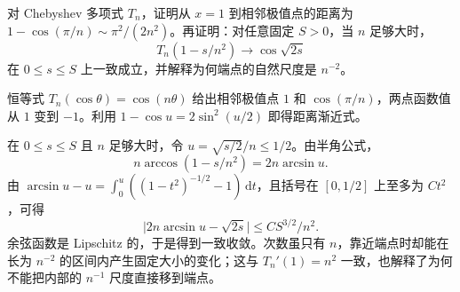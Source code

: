 \begin{optionalexercise}[端点附近的振荡尺度]\label{b2:ex:approximation-endpoint-scale}
对 Chebyshev 多项式 \(T_n\)，证明从 \(x=1\) 到相邻极值点的距离为 \(1-\cos(\pi/n)\sim\pi^2/(2n^2)\)。再证明：对任意固定 \(S>0\)，当 \(n\) 足够大时，
\[
 T_n(1-s/n^2)\longrightarrow\cos\sqrt{2s}
\]
在 \(0\leq s\leq S\) 上一致成立，并解释为何端点的自然尺度是 \(n^{-2}\)。
\end{optionalexercise}
\begin{solution}
恒等式 \(T_n(\cos\theta)=\cos(n\theta)\) 给出相邻极值点 \(1\) 和 \(\cos(\pi/n)\)，两点函数值从 \(1\) 变到 \(-1\)。利用 \(1-\cos u=2\sin^2(u/2)\) 即得距离渐近式。

在 \(0\leq s\leq S\) 且 \(n\) 足够大时，令 \(u=\sqrt{s/2}/n\leq1/2\)。由半角公式，
\[
 n\arccos(1-s/n^2)=2n\arcsin u.
\]
由 \(\arcsin u-u=\int_0^u((1-t^2)^{-1/2}-1)\,\mathrm dt\)，且括号在 \([0,1/2]\) 上至多为 \(Ct^2\)，可得
\[
 \bigl|2n\arcsin u-\sqrt{2s}\bigr|\leq C S^{3/2}/n^2.
\]
余弦函数是 Lipschitz 的，于是得到一致收敛。次数虽只有 \(n\)，靠近端点时却能在长为 \(n^{-2}\) 的区间内产生固定大小的变化；这与 \(T_n'(1)=n^2\) 一致，也解释了为何不能把内部的 \(n^{-1}\) 尺度直接移到端点。
\end{solution}
